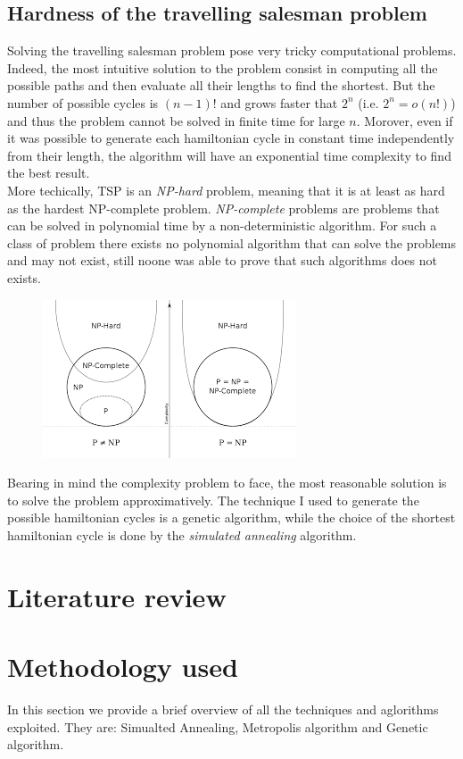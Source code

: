 \documentclass{article}
\begin{document}
\subsection{Hardness of the travelling salesman problem}
Solving the travelling salesman problem pose very tricky computational problems. Indeed, the most intuitive solution to the problem consist in computing all the possible paths and then evaluate all their lengths to find the shortest. But the number of possible cycles is $(n-1)!$ and grows faster that $2^n$ (i.e. $2^n = o(n!)$) and thus the problem cannot be solved in finite time for large $n$. Morover, even if it was possible to generate each hamiltonian cycle in constant time independently from their length, the algorithm will have an exponential time complexity to find the best result.  \\
More techically, TSP is an \textit{NP-hard} problem, meaning that it is at least as hard as the hardest NP-complete problem. \textit{NP-complete} problems are problems that can be solved in polynomial time by a non-deterministic algorithm. For such a class of problem there exists no polynomial algorithm that can solve the problems and may not exist, still noone was able to prove that such algorithms does not exists.
\begin{figure}[H]
\includegraphics[scale=1]{complexity_classes.png} 
\centering
\end{figure}
\noindent Bearing in mind the complexity problem to face, the most reasonable solution is to solve the problem approximatively. The technique I used to generate the possible hamiltonian cycles is a genetic algorithm, while the choice of the shortest hamiltonian cycle is done by the \textit{simulated annealing} algorithm.

\section{Literature review}

\section{Methodology used}
In this section we provide a brief overview of all the techniques and aglorithms exploited. They are: Simualted Annealing, Metropolis algorithm and Genetic algorithm.
\end{document}
